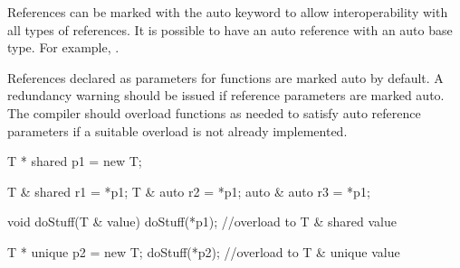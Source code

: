 References can be marked with the auto keyword to allow interoperability with all types of references. It is possible to have an auto reference with an auto base type. For example, .

References declared as parameters for functions are marked auto by default. A redundancy warning should be issued if reference parameters are marked auto. The compiler should overload functions as needed to satisfy auto reference parameters if a suitable overload is not already implemented.

\begin{codeblock}

T * shared p1 = new T;

T & shared r1 = *p1;
T & auto r2 = *p1;
auto & auto r3 = *p1;

void doStuff(T & value) {}
doStuff(*p1);	//overload to T & shared value

T * unique p2 = new T;
doStuff(*p2);	//overload to T & unique value

\end{codeblock}
